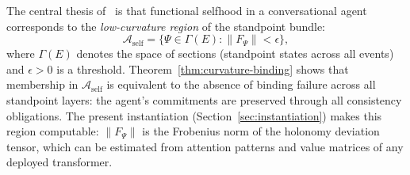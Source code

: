 \begin{remark}
\label{rem:low-curvature-attractor}
The central thesis of~\cite{LCESA} is that functional selfhood in a conversational agent
corresponds to the \emph{low-curvature region} of the standpoint bundle:
\[
    \mathcal{A}_{\mathrm{self}} = \{\Psi \in \Gamma(E) : \|F_\Psi\| < \epsilon\},
\]
where $\Gamma(E)$ denotes the space of sections (standpoint states across all events) and
$\epsilon > 0$ is a threshold. Theorem~\ref{thm:curvature-binding} shows that membership
in $\mathcal{A}_{\mathrm{self}}$ is equivalent to the absence of binding failure across all
standpoint layers: the agent's commitments are preserved through all consistency
obligations. The present instantiation (Section~\ref{sec:instantiation}) makes this
region computable: $\|F_\Psi\|$ is the Frobenius norm of the holonomy deviation tensor, which can
be estimated from attention patterns and value matrices of any deployed transformer.
\end{remark}
